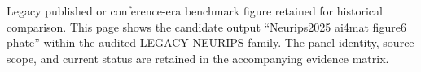 Legacy published or conference-era benchmark figure retained for historical comparison. This page shows the candidate output ``Neurips2025 ai4mat figure6 phate'' within the audited LEGACY-NEURIPS family. The panel identity, source scope, and current status are retained in the accompanying evidence matrix.
